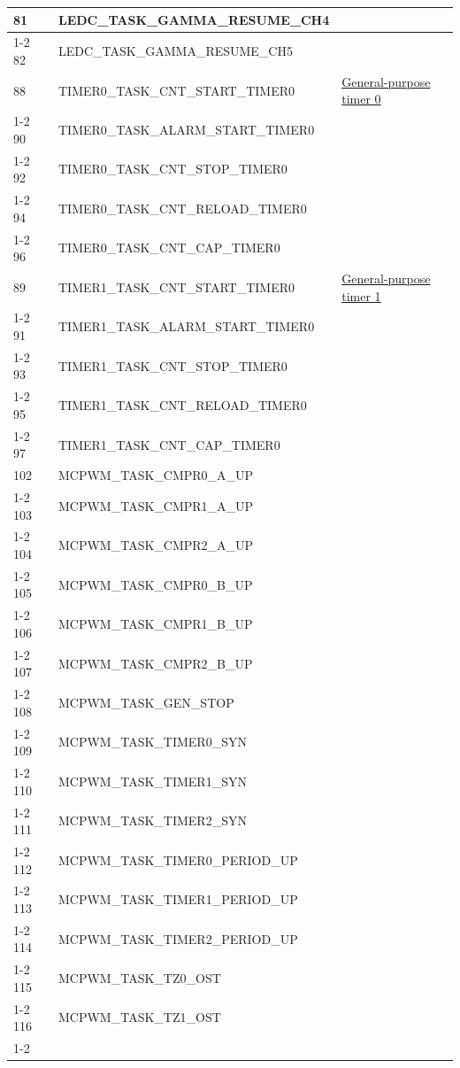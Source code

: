 \documentclass[main\_\_EN.tex]{subfiles}
\begin{document}
\begin{longtable}{ | l | l | l | }
81  & LEDC\_TASK\_GAMMA\_RESUME\_CH4& \\ \cline{1-2}
82  & LEDC\_TASK\_GAMMA\_RESUME\_CH5& \\ \hline
88  & TIMER0\_TASK\_CNT\_START\_TIMER0     & \hyperref[mod:timg]{General-purpose timer 0}\\ \cline{1-2}
90  & TIMER0\_TASK\_ALARM\_START\_TIMER0   & \\ \cline{1-2}
92  & TIMER0\_TASK\_CNT\_STOP\_TIMER0      & \\ \cline{1-2}
94  & TIMER0\_TASK\_CNT\_RELOAD\_TIMER0    & \\ \cline{1-2}
96  & TIMER0\_TASK\_CNT\_CAP\_TIMER0& \\ \hline
89  & TIMER1\_TASK\_CNT\_START\_TIMER0     & \hyperref[mod:timg]{General-purpose timer 1}\\ \cline{1-2}
91  & TIMER1\_TASK\_ALARM\_START\_TIMER0   & \\ \cline{1-2}
93  & TIMER1\_TASK\_CNT\_STOP\_TIMER0      & \\ \cline{1-2}
95  & TIMER1\_TASK\_CNT\_RELOAD\_TIMER0    & \\ \cline{1-2}
97  & TIMER1\_TASK\_CNT\_CAP\_TIMER0& \\ \hline
102 & MCPWM\_TASK\_CMPR0\_A\_UP& \nameref{mod:mcpwm}\\ \cline{1-2}
103 & MCPWM\_TASK\_CMPR1\_A\_UP& \\ \cline{1-2}
104 & MCPWM\_TASK\_CMPR2\_A\_UP& \\ \cline{1-2}
105 & MCPWM\_TASK\_CMPR0\_B\_UP& \\ \cline{1-2}
106 & MCPWM\_TASK\_CMPR1\_B\_UP& \\ \cline{1-2}
107 & MCPWM\_TASK\_CMPR2\_B\_UP& \\ \cline{1-2}
108 & MCPWM\_TASK\_GEN\_STOP & \\ \cline{1-2}
109 & MCPWM\_TASK\_TIMER0\_SYN & \\ \cline{1-2}
110 & MCPWM\_TASK\_TIMER1\_SYN & \\ \cline{1-2}
111 & MCPWM\_TASK\_TIMER2\_SYN & \\ \cline{1-2}
112 & MCPWM\_TASK\_TIMER0\_PERIOD\_UP      & \\ \cline{1-2}
113 & MCPWM\_TASK\_TIMER1\_PERIOD\_UP      & \\ \cline{1-2}
114 & MCPWM\_TASK\_TIMER2\_PERIOD\_UP      & \\ \cline{1-2}
115 & MCPWM\_TASK\_TZ0\_OST  & \\ \cline{1-2}
116 & MCPWM\_TASK\_TZ1\_OST  & \\ \cline{1-2}

\end{longtable}
\end{document}
